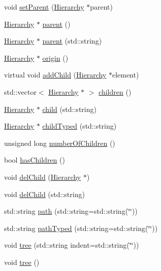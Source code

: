 \begin{DoxyCompactItemize}
\item 
void \hyperlink{classHierarchy_a585ad1aeec16077a0e532ab8b4fc557b}{setParent} (\hyperlink{classHierarchy}{Hierarchy} $\ast$parent)
\item 
\hyperlink{classHierarchy}{Hierarchy} $\ast$ \hyperlink{classHierarchy_a1c7bec8257e717f9c1465e06ebf845fc}{parent} ()
\item 
\hyperlink{classHierarchy}{Hierarchy} $\ast$ \hyperlink{classHierarchy_ad550588733bf75ac5c0fcfd7c8fd11a6}{parent} (std::string)
\item 
\hyperlink{classHierarchy}{Hierarchy} $\ast$ \hyperlink{classHierarchy_aee461dc930ce3871636ff87f075b1b83}{origin} ()
\item 
virtual void \hyperlink{classHierarchy_ad677774ff38fcb257c04a3a10d471fac}{addChild} (\hyperlink{classHierarchy}{Hierarchy} $\ast$element)
\item 
std::vector$<$ \hyperlink{classHierarchy}{Hierarchy} $\ast$ $>$ \hyperlink{classHierarchy_aa9a76f69e98e052ee1a6e32cea006288}{children} ()
\item 
\hyperlink{classHierarchy}{Hierarchy} $\ast$ \hyperlink{classHierarchy_a1e207f973c694b538bf90107b4868817}{child} (std::string)
\item 
\hyperlink{classHierarchy}{Hierarchy} $\ast$ \hyperlink{classHierarchy_a0c15a5276a3b80b4354d6bd8a01e0708}{childTyped} (std::string)
\item 
unsigned long \hyperlink{classHierarchy_ab16e84de65fd84e14001a6cf941c8be4}{numberOfChildren} ()
\item 
bool \hyperlink{classHierarchy_a255174fe4d316d2a3f430dcb9dab29f1}{hasChildren} ()
\item 
void \hyperlink{classHierarchy_a2b2b359fac003233f65786a616766bde}{delChild} (\hyperlink{classHierarchy}{Hierarchy} $\ast$)
\item 
void \hyperlink{classHierarchy_a1928ac7615fe0b5e55cd707f70dc6781}{delChild} (std::string)
\item 
std::string \hyperlink{classHierarchy_aa7990fa7caf132d83e361ce033c6c65a}{path} (std::string=std::string(\char`\"{}\char`\"{}))
\item 
std::string \hyperlink{classHierarchy_a1efd56cd164d328d2002e53a10a19b8c}{pathTyped} (std::string=std::string(\char`\"{}\char`\"{}))
\item 
void \hyperlink{classHierarchy_a76e914b9a677a22a82deb74d892bf261}{tree} (std::string indent=std::string(\char`\"{}\char`\"{}))
\item 
void \hyperlink{classHierarchy_a594c294c5f60c230e106d522ed008212}{tree} ()

\end{DoxyCompactItemize}
